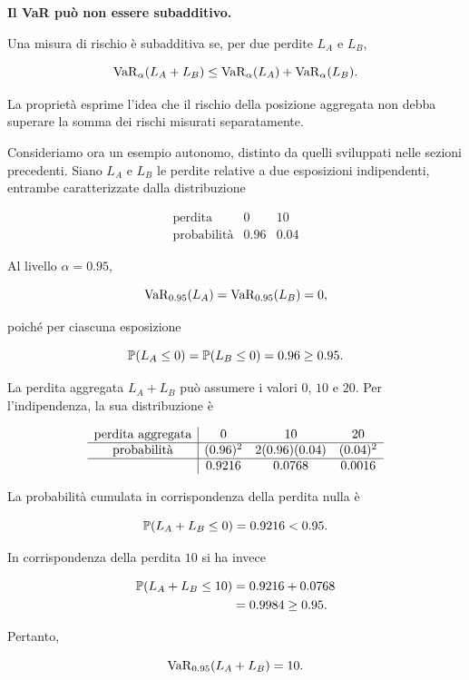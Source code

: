 \medskip

\noindent
\textbf{Il VaR pu\`{o} non essere subadditivo.}

Una misura di rischio \`{e} subadditiva se, per due perdite $L_A$ e
$L_B$,

\[
\operatorname{VaR}_{\alpha}(L_A+L_B)
\leq
\operatorname{VaR}_{\alpha}(L_A)
+
\operatorname{VaR}_{\alpha}(L_B).
\]

La propriet\`{a} esprime l'idea che il rischio della posizione
aggregata non debba superare la somma dei rischi misurati separatamente.

Consideriamo ora un esempio autonomo, distinto da quelli sviluppati
nelle sezioni precedenti. Siano $L_A$ e $L_B$ le perdite relative a
due esposizioni indipendenti, entrambe caratterizzate dalla
distribuzione

\[
\begin{array}{c|cc}
\text{perdita}
&
0
&
10
\\
\hline
\text{probabilit\`{a}}
&
0.96
&
0.04
\end{array}
\]

Al livello $\alpha=0.95$,

\[
\operatorname{VaR}_{0.95}(L_A)
=
\operatorname{VaR}_{0.95}(L_B)
=
0,
\]

poich\'{e} per ciascuna esposizione

\[
\mathbb{P}(L_A\leq0)
=
\mathbb{P}(L_B\leq0)
=
0.96
\geq
0.95.
\]

La perdita aggregata $L_A+L_B$ pu\`{o} assumere i valori $0$, $10$ e
$20$. Per l'indipendenza, la sua distribuzione \`{e}

\[
\begin{array}{c|ccc}
\text{perdita aggregata}
&
0
&
10
&
20
\\
\hline
\text{probabilit\`{a}}
&
(0.96)^2
&
2(0.96)(0.04)
&
(0.04)^2
\\
\hline
&
0.9216
&
0.0768
&
0.0016
\end{array}
\]

La probabilit\`{a} cumulata in corrispondenza della perdita nulla
\`{e}

\[
\mathbb{P}(L_A+L_B\leq0)
=
0.9216
<
0.95.
\]

In corrispondenza della perdita $10$ si ha invece

\[
\begin{split}
\mathbb{P}(L_A+L_B\leq10)
&=
0.9216+0.0768
\\
&=
0.9984
\geq
0.95.
\end{split}
\]

Pertanto,

\[
\operatorname{VaR}_{0.95}(L_A+L_B)=10.
\]

